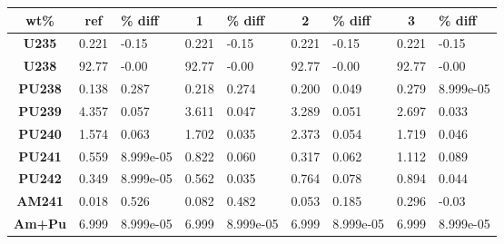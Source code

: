	\begin{tabular}{c|ca|ca|ca|ca}
		\hline
		\textbf{wt\%} & \textbf{ref}  & \textbf{\% diff} & \textbf{1} & \textbf{\% diff} & \textbf{2} & \textbf{\% diff} & \textbf{3} & \textbf{\% diff}\\ 
		\hline
		\textbf{U235} & 0.221 & -0.15 & 0.221 & -0.15 & 0.221 & -0.15 & 0.221 & -0.15 \\ 
		\textbf{U238} & 92.77 & -0.00 & 92.77 & -0.00 & 92.77 & -0.00 & 92.77 & -0.00 \\ 
		\textbf{PU238} & 0.138 & 0.287 & 0.218 & 0.274 & 0.200 & 0.049 & 0.279 & 8.999e-05 \\ 
		\textbf{PU239} & 4.357 & 0.057 & 3.611 & 0.047 & 3.289 & 0.051 & 2.697 & 0.033 \\ 
		\textbf{PU240} & 1.574 & 0.063 & 1.702 & 0.035 & 2.373 & 0.054 & 1.719 & 0.046 \\ 
		\textbf{PU241} & 0.559 & 8.999e-05 & 0.822 & 0.060 & 0.317 & 0.062 & 1.112 & 0.089 \\ 
		\textbf{PU242} & 0.349 & 8.999e-05 & 0.562 & 0.035 & 0.764 & 0.078 & 0.894 & 0.044 \\ 
		\textbf{AM241} & 0.018 & 0.526 & 0.082 & 0.482 & 0.053 & 0.185 & 0.296 & -0.03 \\ 
		\hline
		\hline
		\textbf{Am+Pu} & 6.999 & 8.999e-05 & 6.999 & 8.999e-05 & 6.999 & 8.999e-05 & 6.999 & 8.999e-05 \\ 
		\hline 
	\end{tabular} 
